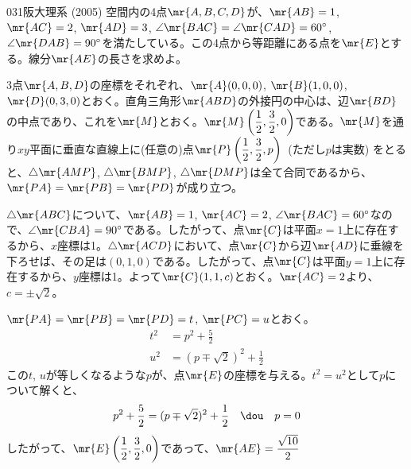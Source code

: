\begin{prob}{031}{}{阪大理系 (2005)}
 空間内の4点$\mr{A, B, C, D}$が、$\mr{AB}=1$, $\mr{AC}=2$, $\mr{AD}=3$, $\angle\mr{BAC}=\angle\mr{CAD}=60^\circ$, $\angle\mr{DAB}=90^\circ$を満たしている。この4点から等距離にある点を$\mr{E}$とする。線分$\mr{AE}$の長さを求めよ。
\end{prob}
3点$\mr{A, B, D}$の座標をそれぞれ、$\mr{A}(0, 0, 0)$, $\mr{B}(1, 0, 0)$, $\mr{D}(0, 3, 0)$とおく。直角三角形$\mr{ABD}$の外接円の中心は、辺$\mr{BD}$の中点であり、これを$\mr{M}$とおく。$\mr{M}\left(\dfrac{1}{2}, \dfrac{3}{2}, 0\right)$である。$\mr{M}$を通り$xy$平面に垂直な直線上に(任意の)点$\mr{P}\left(\dfrac{1}{2}, \dfrac{3}{2}, p\right)$~(ただし$p$は実数) をとると、$\triangle\mr{AMP}$, $\triangle
\mr{BMP}$, $\triangle\mr{DMP}$は全て合同であるから、$\mr{PA}=\mr{PB}=\mr{PD}$が成り立つ。

$\triangle\mr{ABC}$について、$\mr{AB}=1$, $\mr{AC}=2$, $\angle\mr{BAC}=60^\circ$なので、$\angle\mr{CBA}=90^\circ$である。したがって、点$\mr{C}$は平面$x=1$上に存在するから、$x$座標は1。$\triangle\mr{ACD}$において、点$\mr{C}$から辺$\mr{AD}$に垂線を下ろせば、その足は$(0, 1, 0)$である。したがって、点$\mr{C}$は平面$y=1$上に存在するから、$y$座標は1。よって$\mr{C}(1, 1, c)$とおく。$\mr{AC}=2$より、$c=\pm\sqrt{2}$。

$\mr{PA}=\mr{PB}=\mr{PD}=t$, $\mr{PC}=u$とおく。
\begin{align*}
 t^2&=p^2+\frac{5}{2} \\
 u^2&=(p\mp\sqrt{2})^2+\frac{1}{2}
\end{align*}
この$t$, $u$が等しくなるような$p$が、点$\mr{E}$の座標を与える。$t^2=u^2$として$p$について解くと、
\[ p^2+\frac{5}{2}=(p\mp\sqrt{2})^2+\frac{1}{2} \quad\dou\quad p=0 \]
したがって、$\mr{E}\left(\dfrac{1}{2}, \dfrac{3}{2}, 0\right)$であって、$\mr{AE}=\dfrac{\sqrt{10}}{2}$
